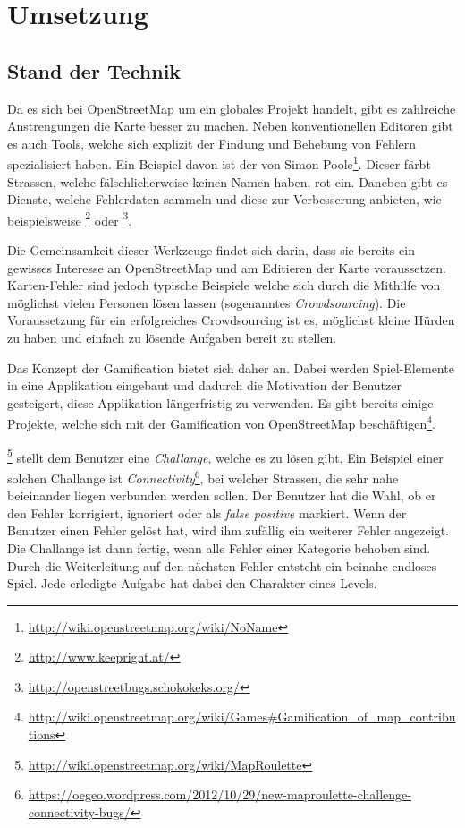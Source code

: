 \chapter{Umsetzung}
\label{umsetzung}

\section{Stand der Technik}
Da es sich bei \gls{OpenStreetMap} um ein globales Projekt handelt, gibt es zahlreiche Anstrengungen die Karte besser zu machen.
Neben konventionellen Editoren gibt es auch Tools, welche sich explizit der Findung und Behebung von Fehlern spezialisiert haben.
Ein Beispiel davon ist der  von Simon Poole\footnote{\url{http://wiki.openstreetmap.org/wiki/NoName}}. Dieser färbt Strassen, welche fälschlicherweise keinen Namen haben, rot ein.
Daneben gibt es Dienste, welche Fehlerdaten sammeln und diese zur Verbesserung anbieten, wie beispielsweise \footnote{\url{http://www.keepright.at/}} oder \footnote{\url{http://openstreetbugs.schokokeks.org/}}.

Die Gemeinsamkeit dieser Werkzeuge findet sich darin, dass sie bereits ein gewisses Interesse an \gls{OpenStreetMap} und am Editieren der Karte voraussetzen.
Karten-Fehler sind jedoch typische Beispiele welche sich durch die Mithilfe von möglichst vielen Personen lösen lassen (sogenanntes \emph{Crowdsourcing}).
Die Voraussetzung für ein erfolgreiches Crowdsourcing ist es, möglichst kleine Hürden zu haben und einfach zu lösende Aufgaben bereit zu stellen.

Das Konzept der \gls{Gamification} bietet sich daher an.
Dabei werden Spiel-Elemente in eine Applikation eingebaut und dadurch die Motivation der Benutzer gesteigert, diese Applikation längerfristig zu verwenden.
Es gibt bereits einige Projekte, welche sich mit der \gls{Gamification} von \gls{OpenStreetMap} beschäftigen\footnote{\url{http://wiki.openstreetmap.org/wiki/Games\#Gamification_of_map_contributions}}.

\footnote{\url{http://wiki.openstreetmap.org/wiki/MapRoulette}} stellt dem Benutzer eine \emph{Challange}, welche es zu lösen gibt.
Ein Beispiel einer solchen Challange ist \emph{Connectivity}\footnote{\url{https://oegeo.wordpress.com/2012/10/29/new-maproulette-challenge-connectivity-bugs/}}, bei welcher Strassen, die sehr nahe beieinander liegen verbunden werden sollen.
Der Benutzer hat die Wahl, ob er den Fehler korrigiert, ignoriert oder als \emph{false positive} markiert.
Wenn der Benutzer einen Fehler gelöst hat, wird ihm zufällig ein weiterer Fehler angezeigt.
Die Challange ist dann fertig, wenn alle Fehler einer Kategorie behoben sind.
Durch die Weiterleitung auf den nächsten Fehler entsteht ein beinahe endloses Spiel. Jede erledigte Aufgabe hat dabei den Charakter eines Levels.

